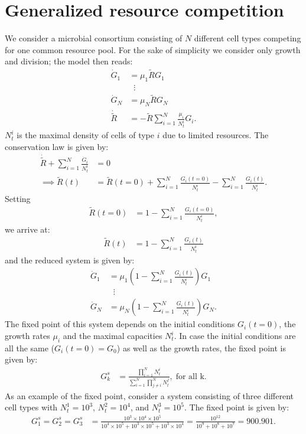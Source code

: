 \documentclass[10pt,1p,authoryear]{elsarticle}
\numberwithin{equation}{section}
\begin{document}
\section{Generalized resource competition}
\label{ssec:supplement0}
We consider a microbial consortium consisting of $N$ different cell types competing for one common resource pool. For the sake of simplicity we consider only growth and division; the model then reads:
\begin{align}
\dot{G}_1&=\mu_1\tilde{R}G_1\nonumber\\
	&\;\;\vdots\\
\dot{G}_N&=\mu_N\tilde{R}G_N\nonumber\\
\dot{\tilde{R}}&=-\tilde{R}\sum_{i=1}^N\frac{\mu_i}{N_t^{i}}G_i\nonumber.
\end{align}
$N_t^{i}$ is the maximal density of cells of type $i$ due to limited resources. The conservation law is given by:
\begin{align}
\dot{\tilde{R}}+\sum_{i=1}^N\frac{\dot{G}_i}{N_t^{i}}&=0\\
\implies\tilde{R}(t)&=\tilde{R}(t=0)+\sum_{i=1}^N\frac{G_i(t=0)}{N_t^{i}}-\sum_{i=1}^N\frac{G_i(t)}{N_t^{i}}.
\end{align}
Setting 
\begin{align}
\tilde{R}(t=0)&=1-\sum_{i=1}^N\frac{G_i(t=0)}{N_t^{i}},
\end{align}
we arrive at:
\begin{align}
\tilde{R}(t)&=1-\sum_{i=1}^N\frac{G_i(t)}{N_t^{i}}
\end{align}
and the reduced system is given by:
\begin{align}
\dot{G}_1&=\mu_1\left(1-\sum_{i=1}^N\frac{G_i(t)}{N_t^{i}}\right)G_1\nonumber\\
	&\;\;\vdots\\
\dot{G}_N&=\mu_N\left(1-\sum_{i=1}^N\frac{G_i(t)}{N_t^{i}}\right)G_N\nonumber.
\end{align}
The fixed point of this system depends on the initial conditions $G_i(t=0)$, the growth rates $\mu_i$ and the maximal capacities $N_t^{i}$. In case the initial conditions are all the same ($G_i(t=0)=G_0$) as well as the growth rates, the fixed point is given by: 
\begin{align}
G_k^s&=\frac{\prod_{i=1}^N N_t^{i}}{\sum_{i=1}^N \prod_{j\neq i}^{N}N_t^{j}},\; \text{for all k.}
\end{align}
As an example of the fixed point, consider a system consisting of three different cell types with $N_t^1=10^3$, $N_t^2=10^4$, and $N_t^3=10^5$. The fixed point is given by:
\begin{align}
G_1^s=G_2^s=G_3^s&=\frac{10^3\times10^4\times10^5}{10^4\times10^5+10^3\times10^5+10^3\times10^4}=\frac{10^{12}}{10^9+10^8+10^7}=900.901.
\end{align}
%
\end{document}
